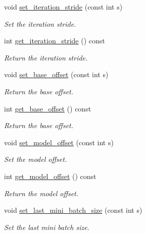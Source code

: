 \begin{DoxyCompactItemize}
void \hyperlink{classlbann_1_1generic__data__reader_ac1f3f81ca0e2920658cba026fe09a95b}{set\+\_\+iteration\+\_\+stride} (const int s)
\begin{DoxyCompactList}\small\item\em Set the iteration stride. \end{DoxyCompactList}\item 
int \hyperlink{classlbann_1_1generic__data__reader_ac84ecef4f72f209420279526e3e6c77b}{get\+\_\+iteration\+\_\+stride} () const
\begin{DoxyCompactList}\small\item\em Return the iteration stride. \end{DoxyCompactList}\item 
void \hyperlink{classlbann_1_1generic__data__reader_adcf4c6012f44c78589bb75ea530cf518}{set\+\_\+base\+\_\+offset} (const int s)
\begin{DoxyCompactList}\small\item\em Return the base offset. \end{DoxyCompactList}\item 
int \hyperlink{classlbann_1_1generic__data__reader_a65b9d39e7585ec325eb40a123cd70891}{get\+\_\+base\+\_\+offset} () const
\begin{DoxyCompactList}\small\item\em Return the base offset. \end{DoxyCompactList}\item 
void \hyperlink{classlbann_1_1generic__data__reader_ab20e835e0e0565717e0fd74da09d4890}{set\+\_\+model\+\_\+offset} (const int s)
\begin{DoxyCompactList}\small\item\em Set the model offset. \end{DoxyCompactList}\item 
int \hyperlink{classlbann_1_1generic__data__reader_a9e78b6062be9746c81eabf0f9d28264e}{get\+\_\+model\+\_\+offset} () const
\begin{DoxyCompactList}\small\item\em Return the model offset. \end{DoxyCompactList}\item 
void \hyperlink{classlbann_1_1generic__data__reader_a357389ee93428b68f9400de708f6915d}{set\+\_\+last\+\_\+mini\+\_\+batch\+\_\+size} (const int s)
\begin{DoxyCompactList}\small\item\em Set the last mini batch size. \end{DoxyCompactList}\item 

\end{DoxyCompactItemize}
